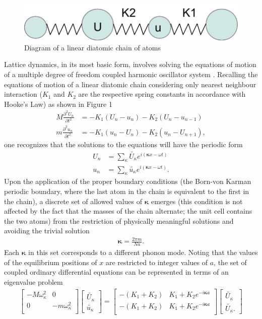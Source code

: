 \documentclass{article}
\begin{document}
\begin{figure}[ht]
\centering
\includegraphics[scale=0.5]{diatomic.png}
\caption{Diagram of a linear diatomic chain of atoms}
\end{figure}
Lattice dynamics, in its most basic form, involves solving the equations of motion of a multiple degree of freedom coupled harmonic oscillator system \cite{dove}. Recalling the equations of motion of a linear diatomic chain considering only nearest neighbour interaction ($K_1$ and $K_2$ are the respective spring constants in accordance with Hooke's Law) as shown in Figure 1
\begin{eqnarray}
	M\frac{\partial ^2 U_n}{\partial t^2}&=-K_1(U_n-u_n)-K_2(U_n-u_{n-1})\\
	m\frac{\partial ^2 u_n}{\partial t^2}&=-K_1(u_n-U_n)-K_2(u_n-U_{n+1}),
\end{eqnarray}
one recognizes that the solutions to the equations will have the periodic form
\begin{eqnarray}
	U_n&=\sum_\kappa \tilde{U_\kappa}e^{i(\pmb{\kappa} x-\omega t)}\\
	u_n&=\sum_\kappa \tilde{u_\kappa}e^{i(\pmb{\kappa} x-\omega t)}.
\end{eqnarray}
Upon the application of the proper boundary conditions (the Born-von Karman periodic boundary, where the last atom in the chain is equivalent to the first in the chain), a discrete set of allowed values of $\pmb{\kappa}$ emerges (this condition is not affected by the fact that the masses of the chain alternate; the unit cell contains the two atoms) from the restriction of physically meaningful solutions and avoiding the trivial solution
\begin{eqnarray}
	\pmb{\kappa}=\frac{2\pi m}{Na}.
\end{eqnarray}
Each $\pmb{\kappa}$ in this set corresponds to a different phonon mode. Noting that the values of the equilibrium positions of $x$ are restricted to integer values of $a$, the set of coupled ordinary differential equations can be represented in terms of an eigenvalue problem
\begin{eqnarray}
\begin{bmatrix}
  -M\omega_\kappa^2 & 0\\
  0 & -m\omega_\kappa^2\\ 
 \end{bmatrix}
\begin{bmatrix}
\tilde{U_\kappa} \\ 
\tilde{u_\kappa}
\end{bmatrix}
=
\begin{bmatrix}
  -(K_1+K_2) & K_1+K_2e^{-i\pmb{\kappa} a}\\
  -(K_1+K_2) & K_1+K_2e^{-i\pmb{\kappa} a}\\ 
 \end{bmatrix}
\begin{bmatrix}
\tilde{U_\kappa} \\ \tilde{U_\kappa}.
\end{bmatrix}
\end{eqnarray}
\end{document}
